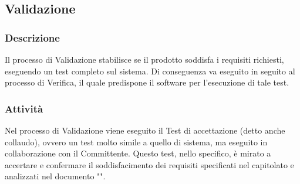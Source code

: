   \subsection{Validazione}
    \subsubsection{Descrizione}
      Il processo di Validazione stabilisce se il prodotto soddisfa i requisiti richiesti, eseguendo un test completo sul sistema. Di conseguenza va eseguito in seguito al processo di Verifica, il quale predispone il software per l'esecuzione di tale test.

    \subsubsection{Attività}
        Nel processo di Validazione viene eseguito il Test di accettazione (detto anche collaudo), ovvero un test molto simile a quello di sistema, ma eseguito in collaborazione con il Committente. Questo test, nello specifico, è mirato a accertare e confermare il soddisfacimento dei requisiti specificati nel capitolato e analizzati nel documento "\AdR{}".

